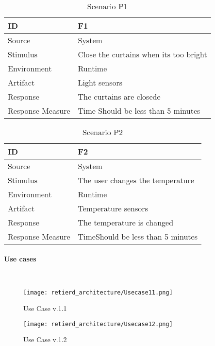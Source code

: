 \documentclass[../document]{subfiles}
\begin{document}
\begin{table}[H]
	\caption{Scenario P1}
	\begin{tabularx}{\textwidth}{|X|X|}
		\hline
		ID					& F1 \\ \hline
		Source				& System \\ \hline
		Stimulus			& Close the curtains when its too bright \\ \hline
		Environment			& Runtime \\ \hline
		Artifact			& Light sensors \\ \hline
		Response			& The curtains are closede \\ \hline
		Response Measure	& Time \newline Should be less than 5 minutes
		\\ \hline
	\end{tabularx}
\end{table}

\begin{table}[H]
	\caption{Scenario P2}
	\begin{tabularx}{\textwidth}{|X|X|}
		\hline
		ID					& F2 \\ \hline
		Source				& System \\ \hline
		Stimulus			& The user changes the temperature \\ \hline
		Environment			& Runtime \\ \hline
		Artifact			& Temperature sensors \\ \hline
		Response			& The temperature is changed \\ \hline
		Response Measure	& Time\newline Should be less than 5 minutes
		\\ \hline
	\end{tabularx}
\end{table}


\paragraph{Use cases} \ \\

\begin{figure}[H]
	\centering
	\texttt{[image: retierd\_architecture/Usecase11.png]}
	\caption{Use Case v.1.1}
\end{figure}

\begin{figure}[H]
	\centering
	\texttt{[image: retierd\_architecture/Usecase12.png]}
	\caption{Use Case v.1.2}
\end{figure}
\end{document}
